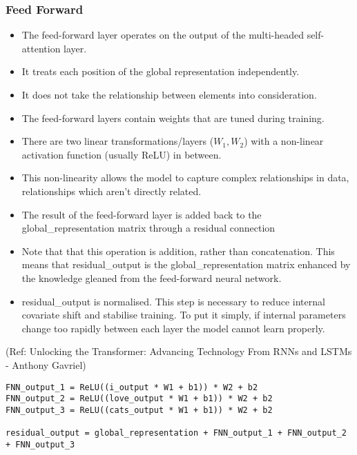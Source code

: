\begin{frame}[fragile]\frametitle{Feed Forward}

\begin{itemize}
\item The feed-forward layer operates on the output of the multi-headed self-attention layer.
\item It treats each position of the global representation independently.
\item It does not take the relationship between elements into consideration.
\item The feed-forward layers contain weights that are tuned during training.
\item There are two linear transformations/layers ($W_1,W_2$) with a non-linear activation function (usually ReLU) in between. 
\item This non-linearity allows the model to capture complex relationships in data, relationships which aren’t directly related.
\item The result of the feed-forward layer is added back to the global\_representation matrix through a residual connection
\item Note that  that this operation is addition, rather than concatenation. This means that residual\_output is the global\_representation matrix enhanced by the knowledge gleaned from the feed-forward neural network.
\item residual\_output is normalised. This step is necessary to reduce internal covariate shift and stabilise training. To put it simply, if internal parameters change too rapidly between each layer the model cannot learn properly.
\end{itemize}


{\tiny (Ref: Unlocking the Transformer: Advancing Technology From RNNs and LSTMs - Anthony Gavriel)}


\begin{lstlisting}
FNN_output_1 = ReLU((i_output * W1 + b1)) * W2 + b2
FNN_output_2 = ReLU((love_output * W1 + b1)) * W2 + b2
FNN_output_3 = ReLU((cats_output * W1 + b1)) * W2 + b2

residual_output = global_representation + FNN_output_1 + FNN_output_2 + FNN_output_3

\end{lstlisting}

\end{frame}



